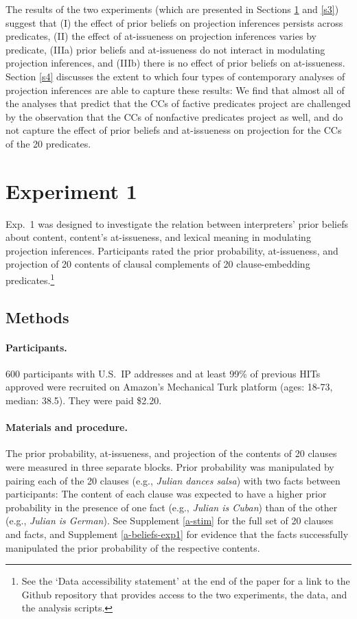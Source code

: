 \documentclass[11pt,fleqn]{article}
\newcommand{\6}{\mbox{$[\hspace*{-.6mm}[$}}
\newcommand{\9}{\mbox{$]\hspace*{-.6mm}]$}}
\begin{document}
The results of the two experiments (which are presented in Sections \ref{s2} and \ref{s3}) suggest that (I) the effect of prior beliefs on projection inferences persists across predicates, (II) the effect of at-issueness on projection inferences varies by predicate, (IIIa) prior beliefs and at-issueness do not interact in modulating projection inferences, and (IIIb) there is no effect of prior beliefs on at-issueness. Section \ref{s4} discusses the extent to which four types of contemporary analyses of projection inferences are able to capture these results: We find that almost all of the analyses that predict that the CCs of factive predicates project are challenged by the observation that the CCs of nonfactive predicates project as well, and do not capture the effect of prior beliefs and at-issueness on projection for the CCs of the 20 predicates.

\section{Experiment 1}\label{s2}

Exp.~1 was designed to investigate the relation between interpreters' prior beliefs about content, content's at-issueness, and lexical meaning in modulating projection inferences. Participants rated the prior probability, at-issueness, and projection of 20 contents of clausal complements of 20 clause-embedding predicates.\footnote{See the `Data accessibility statement' at the end of the paper for a link to the Github repository that provides access to the two experiments, the data, and the analysis scripts.}

\subsection{Methods} 
 
\paragraph{Participants.} 600 participants with U.S.\ IP addresses and at least 99\% of previous HITs approved were recruited on Amazon's Mechanical Turk platform (ages: 18-73, median: 38.5). They were paid \$2.20.

\paragraph{Materials and procedure.} The prior probability, at-issueness, and projection of the contents of 20 clauses were measured in three separate blocks. Prior probability was manipulated by pairing each of the 20 clauses (e.g., \emph{Julian dances salsa})  with two facts between participants: The content of each clause was expected to have a higher prior probability in the presence of one fact (e.g., \emph{Julian is Cuban}) than of the other (e.g., \emph{Julian is German}). See Supplement \ref{a-stim} for the full set of 20 clauses and facts, and Supplement \ref{a-beliefs-exp1} for evidence that the facts successfully manipulated the prior probability of the respective contents.
\end{document}
